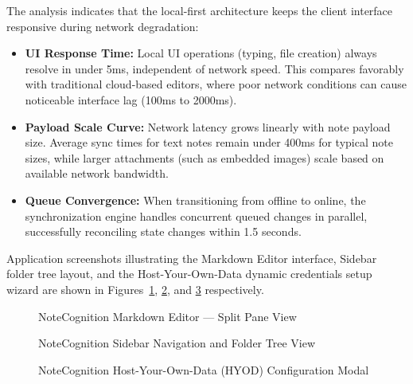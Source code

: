 \documentclass[12pt, a4paper, oneside]{report}
\begin{document}
The analysis indicates that the local-first architecture keeps the client interface responsive during network degradation:
\begin{itemize}
    \item \textbf{UI Response Time:} Local UI operations (typing, file creation) always resolve in under 5ms, independent of network speed. This compares favorably with traditional cloud-based editors, where poor network conditions can cause noticeable interface lag (100ms to 2000ms).
    \item \textbf{Payload Scale Curve:} Network latency grows linearly with note payload size. Average sync times for text notes remain under 400ms for typical note sizes, while larger attachments (such as embedded images) scale based on available network bandwidth.
    \item \textbf{Queue Convergence:} When transitioning from offline to online, the synchronization engine handles concurrent queued changes in parallel, successfully reconciling state changes within 1.5 seconds.
\end{itemize}

Application screenshots illustrating the Markdown Editor interface, Sidebar folder tree layout, and the Host-Your-Own-Data dynamic credentials setup wizard are shown in Figures~\ref{fig:editor}, \ref{fig:sidebar}, and \ref{fig:modal} respectively.

\begin{figure}[H]
    \centering
    \caption{NoteCognition Markdown Editor — Split Pane View}
    \label{fig:editor}
\end{figure}

\begin{figure}[H]
    \centering
    \caption{NoteCognition Sidebar Navigation and Folder Tree View}
    \label{fig:sidebar}
\end{figure}

\begin{figure}[H]
    \centering
    \caption{NoteCognition Host-Your-Own-Data (HYOD) Configuration Modal}
    \label{fig:modal}
\end{figure}
\end{document}
